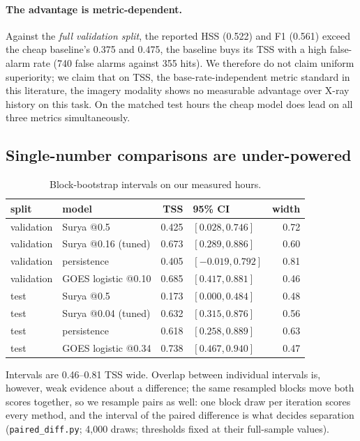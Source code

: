 \documentclass[11pt]{article}
\newcommand{\code}[1]{\texttt{#1}}
\begin{document}
\paragraph{The advantage is metric-dependent.} Against the
\emph{full validation split}, the reported HSS (0.522) and F1 (0.561) exceed the
cheap baseline's 0.375 and 0.475, the baseline buys its TSS with a high
false-alarm rate (740 false alarms against 355 hits). We therefore do not claim
uniform superiority; we claim that on TSS, the base-rate-independent metric
standard in this literature, the imagery modality shows no measurable advantage
over X-ray history on this task. On the matched test hours the cheap model does
lead on all three metrics simultaneously.

\subsection{Single-number comparisons are under-powered}
\label{sec:power}

\begin{table}[htbp]
\centering
\caption{Block-bootstrap intervals on our measured hours.}
\begin{tabular}{llrlr}
\toprule
split & model & TSS & 95\% CI & width \\
\midrule
validation & Surya @0.5 & 0.425 & $[0.028, 0.746]$ & 0.72 \\
validation & Surya @0.16 (tuned) & 0.673 & $[0.289, 0.886]$ & 0.60 \\
validation & persistence & 0.405 & $[-0.019, 0.792]$ & 0.81 \\
validation & GOES logistic @0.10 & 0.685 & $[0.417, 0.881]$ & 0.46 \\
test & Surya @0.5 & 0.173 & $[0.000, 0.484]$ & 0.48 \\
test & Surya @0.04 (tuned) & 0.632 & $[0.315, 0.876]$ & 0.56 \\
test & persistence & 0.618 & $[0.258, 0.889]$ & 0.63 \\
test & GOES logistic @0.34 & 0.738 & $[0.467, 0.940]$ & 0.47 \\
\bottomrule
\end{tabular}
\end{table}

Intervals are 0.46--0.81 TSS wide. Overlap between individual intervals is,
however, weak evidence about a difference; the same resampled blocks move both
scores together, so we resample pairs as well: one block draw per iteration
scores every method, and the interval of the paired difference is what decides
separation (\code{paired\_diff.py}; 4{,}000 draws; thresholds fixed at their
full-sample values).
\end{document}
